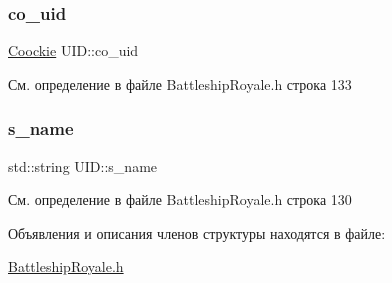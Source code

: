 \subsubsection{\texorpdfstring{co\_uid}{co\_uid}}
{\footnotesize\ttfamily \mbox{\hyperlink{struct_coockie}{Coockie}} U\+I\+D\+::co\+\_\+uid}



См. определение в файле Battleship\+Royale.\+h строка 133

\mbox{\label{struct_u_i_d_ad126ab7d56812c322727617b427068ad}} 
\subsubsection{\texorpdfstring{s\_name}{s\_name}}
{\footnotesize\ttfamily std\+::string U\+I\+D\+::s\+\_\+name}



См. определение в файле Battleship\+Royale.\+h строка 130



Объявления и описания членов структуры находятся в файле\+:\begin{DoxyCompactItemize}
\item 
\mbox{\hyperlink{_battleship_royale_8h}{Battleship\+Royale.\+h}}\end{DoxyCompactItemize}
